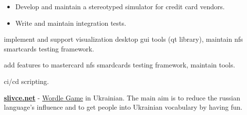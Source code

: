 \documentclass[10pt,a4paper,ragged2e,withhyper]{altacv}
\begin{document}
\begin{itemize}
\item Develop and maintain a stereotyped simulator for credit card vendors.
\item Write and maintain integration tests.
\end{itemize}


 implement and support visualization desktop gui tools (qt library),
maintain nfs smartcards testing framework.

 add features to mastercard nfs smardcards testing
framework, maintain tools.

 ci/cd scripting.

\href{https://slivce.net}{\textbf{slivce.net}} -
\href{https://en.wikipedia.org/wiki/Wordle}{Wordle Game} in Ukrainian. The main aim is to reduce the
russian language's influence and to get people into Ukrainian vocabulary by having fun.

\divider

\divider


\end{document}
